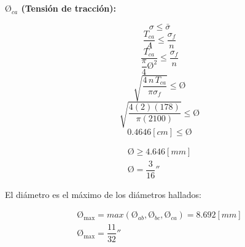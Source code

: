 \documentclass[letter,10pt,twoside]{article}
\begin{document}
\textbf{$\text{\O}_{ca}$ (Tensión de tracción):}

\begin{equation*}
    \sigma \le \bar{\sigma}
\end{equation*}
\begin{equation*}
    \frac{T_{ca}}{A} \le \frac{\sigma_f}{n}
\end{equation*}
\begin{equation*}
    \frac{T_{ca}}{\dfrac{\pi}{4} \text{\O}^2} \le \frac{\sigma_f}{n}
\end{equation*}
\begin{equation*}
    \sqrt{\frac{4\,n\,T_{ca}}{\pi\sigma_f}} \le \text{\O}
\end{equation*}
\begin{equation*}
    \sqrt{\frac{4(2)(178)}{\pi(2100)}} \le \text{\O}
\end{equation*}
\begin{equation*}
    0.4646[cm] \le \text{\O}
\end{equation*}

\begin{equation*}
\boxed{
    \begin{array}{l}
        \text{\O} \ge 4.646[mm] \\
        \text{\O} = \dfrac{3}{16}''
    \end{array}
}
\end{equation*}

El diámetro es el máximo de los diámetros hallados:

\begin{equation*}
\boxed{
    \begin{array}{l}
        \text{\O}_{\text{max}} = max(\text{\O}_{ab},\text{\O}_{bc},\text{\O}_{ca}) = 8.692[mm] \\
        \text{\O}_{\text{max}} = \dfrac{11}{32}''
    \end{array}
}
\end{equation*}
\end{document}
